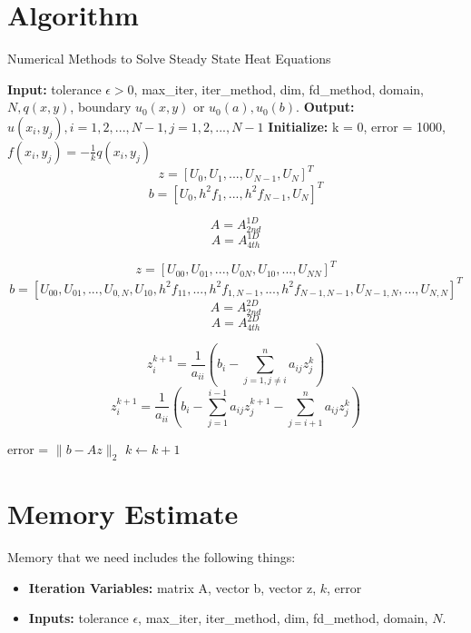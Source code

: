 \documentclass[a4paper]{article}
\begin{document}
\section{Algorithm}
\begin{algorithm}
\caption{Numerical Methods to Solve Steady State Heat Equations}
    \begin{algorithmic}
    \State \textbf{Input:} tolerance $\epsilon >0$, max\_iter, iter\_method, dim, fd\_method, domain, $N, q(x,y)$, boundary $u_0(x,y)$ or $u_0(a), u_0(b)$.
    \State \textbf{Output:} $u(x_i,y_j), i = 1,2,...,N-1, j = 1,2,...,N-1$ 
    \State \textbf{Initialize:} k = 0, error = 1000, $f(x_i,y_j) = -\frac{1}{k}q(x_i,y_j)$
            $$z=[U_0, U_1,...,U_{N-1},U_N]^T$$
            $$b = [ U_0, h^2f_1,...,h^2f_{N-1}, U_N ]^T$$
            
            $$A = A_{2nd}^{1D}$$
            \Else
            $$A = A_{4th}^{1D}$$
            \EndIf
        \EndIf
        
             $$z = [U_{00}, U_{01},...,U_{0N},U_{10},...,U_{NN}]^T$$
             $$b = [U_{00}, U_{01},..., U_{0,N}, U_{10}, h^2f_{11},...,h^2f_{1,N-1},...,h^2f_{N-1,N-1},U_{N-1,N},...,U_{N,N} ]^T $$
            $$A = A_{2nd}^{2D}$$
            \Else
            $$A = A_{4th}^{2D}$$
            \EndIf
        \EndIf
    
        
        
        $$z_i^{k+1} = \frac{1}{a_{ii}}(b_i-\sum_{j=1,j\neq i}^n a_{ij}z_j^k)$$
        \EndIf
        $$z_i^{k+1} = \frac{1}{a_{ii}}(b_i-\sum_{j=1}^{i-1} a_{ij}z_j^{k+1}-\sum_{j=i+1}^{n} a_{ij}z_j^{k})$$
        \EndIf
        \EndFor
         
        \State error = $\|b-Az\|_2$
        \State $k \leftarrow k+1$

        \EndWhile
    \end{algorithmic}
\end{algorithm}

\section{Memory Estimate}
Memory that we need includes the following things:
\begin{itemize}
    \item \textbf{Iteration Variables:} matrix A, vector b, vector z, $k$, error
    \item \textbf{Inputs:} tolerance $\epsilon$, max\_iter, iter\_method, dim, fd\_method, domain, $N$.
\end{itemize}
\end{document}
